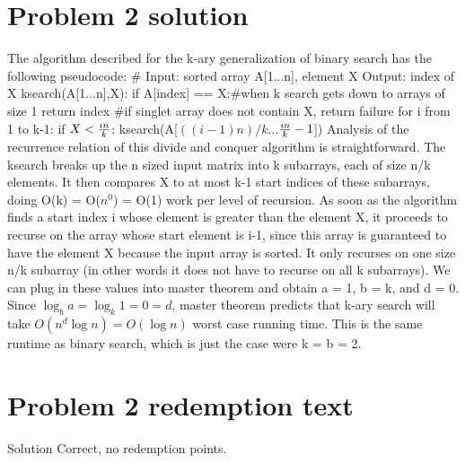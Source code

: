 \documentclass[11pt]{article}
\begin{document}
\newpage
\section*{Problem 2 solution}
The algorithm described for the k-ary generalization of binary search has the following pseudocode:\newline
\newline
\# Input: sorted array A[1...n], element X \indent Output: index of X\newline
ksearch(A[1...n],X):\newline
\indent if A[index] == X:\indent \#when k search gets down to arrays of size 1\newline
\indent \indent return index \indent \#if singlet array does not contain X, return failure\newline
\indent for i from 1 to k-1:\newline
\indent \indent if $X < {i n \over k}$:\newline
\indent \indent \indent ksearch(A[$((i-1)n) / k$...${i n \over k}-1$])\newline
\newline
Analysis of the recurrence relation of this divide and conquer algorithm is straightforward. The ksearch breaks up the n sized input matrix into k subarrays, each of size n/k elements. It then compares X to at most k-1 start indices of these subarrays, doing O(k) = O($n^0$) = O(1) work per level of recursion. As soon as the algorithm finds a start index i whose element is greater than the element X, it proceeds to recurse on the array whose start element is i-1, since this array is guaranteed to have the element X because the input array is sorted. It only recurses on one size n/k subarray (in other words it does not have to recurse on all k subarrays). We can plug in these values into master theorem and obtain a = 1, b = k, and d = 0. Since $\log_b a = \log_k 1 = 0 = d$, master theorem predicts that k-ary search will take $O(n^d\log n)=O(\log n)$ worst case running time. This is the same runtime as binary search, which is just the case were k = b = 2.

\newpage
\section*{Problem 2 redemption text}
Solution Correct, no redemption points.

\newpage
\end{document}
